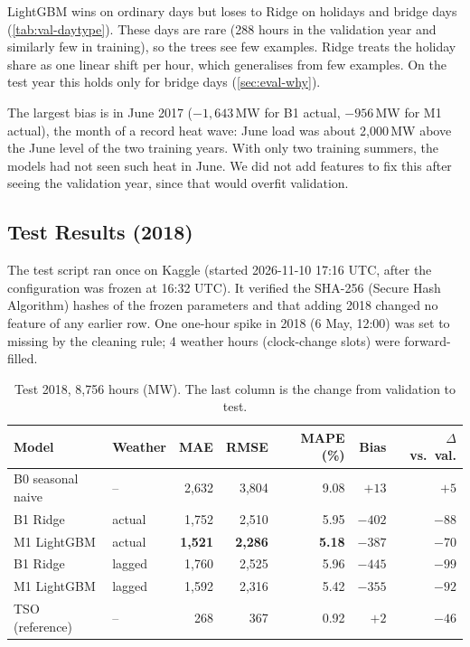 LightGBM wins on ordinary days but loses to Ridge on holidays and bridge days
(\cref{tab:val-daytype}). These days are rare (288 hours in the validation year and similarly few in
training), so the trees see few examples. Ridge treats the holiday share as one linear shift per hour,
which generalises from few examples. On the test year this holds only for bridge days
(\cref{sec:eval-why}).

The largest bias is in June 2017 ($-1{,}643$\,MW for B1 actual, $-956$\,MW for M1 actual), the month
of a record heat wave: June load was about 2{,}000\,MW above the June level of the two training
years. With only two training summers, the models had not seen such heat in June. We did not add
features to fix this after seeing the validation year, since that would overfit validation.

\subsection{Test Results (2018)}
\label{sec:eval-test}

The test script ran once on Kaggle (started 2026-11-10 17:16 UTC, after the configuration was frozen
at 16:32 UTC). It verified the SHA-256 (Secure Hash Algorithm) hashes of the frozen parameters and that adding 2018 changed
no feature of any earlier row. One one-hour spike in 2018 (6 May, 12:00) was set to missing by the
cleaning rule; 4 weather hours (clock-change slots) were forward-filled.

\begin{table}[H]
  \centering
  \small
  \caption{Test 2018, 8{,}756 hours (MW). The last column is the change from validation to test.}
  \label{tab:test}
  \begin{tabular}{@{}l l r r r r r@{}}
    \toprule
    Model & Weather & MAE & RMSE & MAPE (\%) & Bias & $\Delta$ vs.\ val. \\
    \midrule
    B0 seasonal naive & -- & 2{,}632 & 3{,}804 & 9.08 & $+13$ & $+5$ \\
    B1 Ridge & actual & 1{,}752 & 2{,}510 & 5.95 & $-402$ & $-88$ \\
    M1 LightGBM & actual & \textbf{1{,}521} & \textbf{2{,}286} & \textbf{5.18} & $-387$ & $-70$ \\
    B1 Ridge & lagged & 1{,}760 & 2{,}525 & 5.96 & $-445$ & $-99$ \\
    M1 LightGBM & lagged & 1{,}592 & 2{,}316 & 5.42 & $-355$ & $-92$ \\
    \midrule
    TSO (reference) & -- & 268 & 367 & 0.92 & $+2$ & $-46$ \\
    \bottomrule
  \end{tabular}
\end{table}

